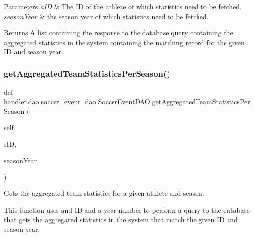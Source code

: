 \begin{DoxyParams}{Parameters}
{\em a\+ID} & The ID of the athlete of which statistics need to be fetched. \\
\hline
{\em season\+Year} & the season year of which statistics need to be fetched.\\
\hline
\end{DoxyParams}
\begin{DoxyReturn}{Returns}
A list containing the response to the database query containing the aggregated statistics in the system containing the matching record for the given ID and season year. 
\end{DoxyReturn}
\mbox{\label{classhandler_1_1dao_1_1soccer__event__dao_1_1_soccer_event_d_a_o_a97953c45058d00a3ee288b84944f596c}} 
\subsubsection{\texorpdfstring{get\+Aggregated\+Team\+Statistics\+Per\+Season()}{getAggregatedTeamStatisticsPerSeason()}}
{\footnotesize\ttfamily def handler.\+dao.\+soccer\+\_\+event\+\_\+dao.\+Soccer\+Event\+D\+A\+O.\+get\+Aggregated\+Team\+Statistics\+Per\+Season (\begin{DoxyParamCaption}\item[{}]{self,  }\item[{}]{s\+ID,  }\item[{}]{season\+Year }\end{DoxyParamCaption})}



Gets the aggregated team statistics for a given athlete and season. 

This function uses and ID and a year number to perform a query to the database that gets the aggregated statistics in the system that match the given ID and season year.



